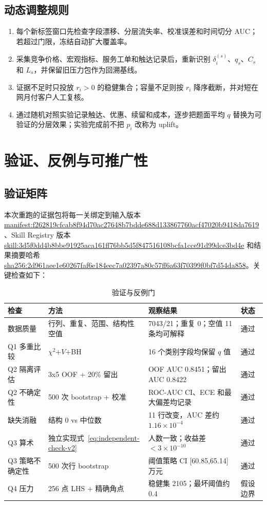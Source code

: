 \documentclass[UTF8,a4paper,11pt]{ctexart}
\newcommand{\code}[1]{\url{#1}}
\begin{document}
\subsection{动态调整规则}
\begin{enumerate}[label=\textbf{D\arabic*}.,leftmargin=2.5em]
  \item 每个新标签窗口先检查字段漂移、分层流失率、校准误差和时间切分 AUC；若超过门限，冻结自动扩大覆盖率。
  \item 采集竞争价格、宏观指标、服务工单和触达记录后，重新识别 \(\delta_i^{(s)}\)、\(q_s\)、\(C_s\) 和 \(L_s\)，并保留旧压力包作为回溯基线。
  \item 证据不足时只投放 \(r_i>0\) 的稳健集合；容量不足则按 \(r_i\) 降序截断，并对短在网月付客户人工复核。
  \item 通过随机对照实验记录触达、优惠、续留和成本，逐步把题面平均 \(q\) 替换为可验证的分层效果；实验完成前不把 \(p_i\) 改称为 uplift。
\end{enumerate}

\section{验证、反例与可推广性}
\label{sec:validation-v2}

\subsection{验证矩阵}
本次重跑的证据包将每一关绑定到输入版本 \code{manifest:f262819cfcab8f94d70ac27648b7bdde688d133867760acf47020b9418da7619}、Skill Registry 版本 \code{skill:3d5f0dd4b8bbe91925aca161ff76bb5d5f847516108bcfa1cce91d99dce3bd4e} 和结果摘要哈希 \code{sha256:2d961aee1e60267faf6e184eec7a02397a80c57ff6a63f70399f0bf7d54da858}。关键检查如下：
\begin{table}[H]
\centering
\caption{验证与反例门}
\label{tab:validation-v2}
\scriptsize
\begin{tabularx}{\linewidth}{@{}l l Y l@{}}
\toprule
检查&方法&观察结果&状态\\
\midrule
数据质量&行列、重复、范围、结构性空值&7043/21；重复 0；空值 11 条均可解释&通过\\
Q1 多重比较&\(\chi^2\)+\(V\)+BH&16 个类别字段均保留 \(q\) 值&通过\\
Q2 隔离评估&3x5 OOF + 20\% 留出&OOF AUC 0.8451；留出 AUC 0.8422&通过\\
Q2 不确定性&500 次 bootstrap + 校准&ROC-AUC CI、ECE 和最大偏差均记录&通过\\
缺失消融&结构 0 vs 中位数&11 行改变，AUC 差约 \(1.16\times10^{-4}\)&通过\\
Q3 算术&独立实现式~\eqref{eq:independent-check-v2}&人数一致；收益差 \(<3\times10^{-10}\)&通过\\
Q3 策略不确定性&500 次行 bootstrap&阈值策略 CI [60.85,65.14] 万元&通过\\
Q4 压力&256 点 LHS + 精确角点&稳健集 2105；最坏阈值约 0.4&假设边界\\
\bottomrule
\end{tabularx}
\end{table}
\end{document}
